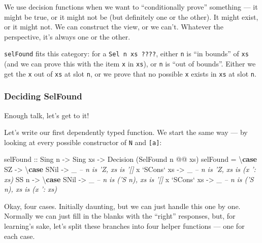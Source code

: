 \documentclass[]{article}
\newenvironment{Shaded}{}{}
\newcommand{\CommentTok}[1]{\textcolor[rgb]{0.38,0.63,0.69}{\textit{#1}}}
\newcommand{\DataTypeTok}[1]{\textcolor[rgb]{0.56,0.13,0.00}{#1}}
\newcommand{\FunctionTok}[1]{\textcolor[rgb]{0.02,0.16,0.49}{#1}}
\newcommand{\KeywordTok}[1]{\textcolor[rgb]{0.00,0.44,0.13}{\textbf{#1}}}
\newcommand{\NormalTok}[1]{#1}
\newcommand{\OtherTok}[1]{\textcolor[rgb]{0.00,0.44,0.13}{#1}}
\begin{document}
We use decision functions when we want to ``conditionally prove'' something ---
it might be true, or it might not be (but definitely one or the other). It might
exist, or it might not. We can construct the view, or we can't. Whatever the
perspective, it's always one or the other.

\texttt{selFound} fits this category: for a \texttt{Sel\ n\ xs\ ????}, either
\texttt{n} is ``in bounds'' of \texttt{xs} (and we can prove this with the item
\texttt{x} in \texttt{xs}), or \texttt{n} is ``out of bounds''. Either we get
the \texttt{x} out of \texttt{xs} at slot \texttt{n}, or we prove that no
possible \texttt{x} exists in \texttt{xs} at slot \texttt{n}.

\hypertarget{deciding-selfound}{%
\subsubsection{Deciding SelFound}\label{deciding-selfound}}

Enough talk, let's get to it!

Let's write our first dependently typed function. We start the same way --- by
looking at every possible constructor of \texttt{N} and \texttt{{[}a{]}}:

\begin{Shaded}
\begin{Highlighting}[]
\NormalTok{selFound}
\OtherTok{    ::} \DataTypeTok{Sing}\NormalTok{ n}
    \OtherTok{->} \DataTypeTok{Sing}\NormalTok{ xs}
    \OtherTok{->} \DataTypeTok{Decision}\NormalTok{ (}\DataTypeTok{SelFound}\NormalTok{ n }\FunctionTok{@@}\NormalTok{ xs)}
\NormalTok{selFound }\FunctionTok{=}\NormalTok{ \textbackslash{}}\KeywordTok{case}
    \DataTypeTok{SZ} \OtherTok{->}\NormalTok{ \textbackslash{}}\KeywordTok{case}
      \DataTypeTok{SNil}         \OtherTok{->}\NormalTok{ _   }\CommentTok{-- n is 'Z, xs is '[]}
\NormalTok{      x }\OtherTok{`SCons`}\NormalTok{ xs }\OtherTok{->}\NormalTok{ _   }\CommentTok{-- n is 'Z, xs is (x ': xs)}
    \DataTypeTok{SS}\NormalTok{ n }\OtherTok{->}\NormalTok{ \textbackslash{}}\KeywordTok{case}
      \DataTypeTok{SNil}         \OtherTok{->}\NormalTok{ _   }\CommentTok{-- n is ('S n), xs is '[]}
\NormalTok{      x }\OtherTok{`SCons`}\NormalTok{ xs }\OtherTok{->}\NormalTok{ _   }\CommentTok{-- n is ('S n), xs is (x ': xs)}
\end{Highlighting}
\end{Shaded}

Okay, four cases. Initially daunting, but we can just handle this one by one.
Normally we can just fill in the blanks with the ``right'' responses, but, for
learning's sake, let's split these branches into four helper functions --- one
for each case.
\end{document}

